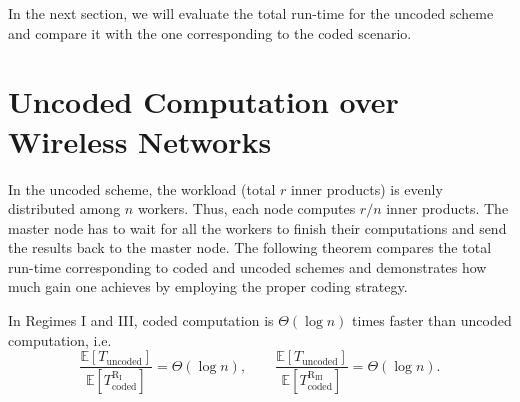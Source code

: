 \documentclass[onecolumn,journal,twoside]{IEEEtran}
\newcommand{\Expc}{\mathbb{E}}
\begin{document}
In the next section, we will evaluate the total run-time for the uncoded scheme and compare it with the one corresponding to the coded scenario. 


\section{Uncoded Computation over Wireless Networks}

In the uncoded scheme, the workload (total $r$ inner products) is evenly distributed among $n$ workers. Thus, each node computes $r/n$ inner products. The master node has to wait for all the workers to finish their computations and send the results back to the master node. The following theorem compares the total run-time corresponding to coded and uncoded schemes and demonstrates how much gain one achieves by employing the proper coding strategy.
\begin{theorem}
In Regimes I and III, coded computation is $\Theta(\log n)$ times faster than uncoded computation, i.e. 
\begin{equation}
    \frac{\Expc[T_{\text{uncoded}}]}{\Expc[T^{\text{R}_{\text{I}}}_{\text{coded}}]}=\Theta(\log n), \qquad \frac{\Expc[T_{\text{uncoded}}]}{\Expc[T^{\text{R}_{\text{III}}}_{\text{coded}}]}=\Theta(\log n).
\end{equation}
\iffalse
In Regime II, coded computation does not provide an unbounded gain compared to uncoded computation, i.e.
\begin{equation}
    \frac{\Expc[T_{\text{uncoded}}]}{\Expc[T^{\text{R}_{\text{II}}}_{\text{coded}}]}=\Theta(1)
\end{equation}
\fi
\end{theorem}
\end{document}
